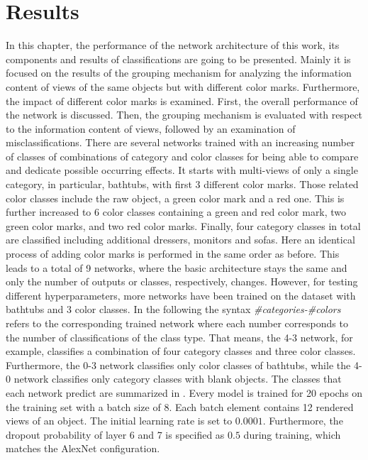 \chapter{Results}
\label{sec:results}
In this chapter, the performance of the network architecture of this work, its components and results of classifications are going to be presented.
Mainly it is focused on the results of the grouping mechanism for analyzing the information content of views of the same objects but with different color marks.
Furthermore, the impact of different color marks is examined.
First, the overall performance of the network is discussed.
Then, the grouping mechanism is evaluated with respect to the information content of views, followed by an examination of misclassifications.
There are several networks trained with an increasing number of classes of combinations of category and color classes for being able to compare and dedicate possible occurring effects.
It starts with multi-views of only a single category, in particular, bathtubs, with first 3 different color marks.
Those related color classes include the raw object, a green color mark and a red one.
This is further increased to 6 color classes containing a green and red color mark, two green color marks, and two red color marks.
Finally, four category classes in total are classified including additional dressers, monitors and sofas.
Here an identical process of adding color marks is performed in the same order as before.
This leads to a total of 9 networks, where the basic architecture stays the same and only the number of outputs or classes, respectively, changes.
However, for testing different hyperparameters, more networks have been trained on the dataset with bathtubs and 3 color classes.
In the following the syntax \emph{\#categories-\#colors} refers to the corresponding trained network where each number corresponds to the number of  classifications of the class type.
That means, the 4-3 network, for example, classifies a combination of four category classes and three color classes.
Furthermore, the 0-3 network classifies only color classes of bathtubs, while the 4-0 network classifies only category classes with blank objects.
The classes that each network predict are summarized in .
Every model is trained for 20 epochs on the training set with a batch size of 8.
Each batch element contains 12 rendered views of an object.
The initial learning rate is set to $0.0001$.
Furthermore, the dropout probability of layer 6 and 7 is specified as $0.5$ during training, which matches the AlexNet configuration.
